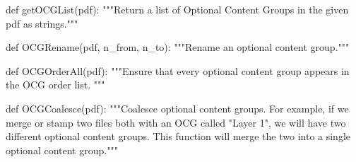 def getOCGList(pdf):
    """Return a list of Optional Content Groups in the given pdf as strings."""

def OCGRename(pdf, n_from, n_to):
    """Rename an optional content group."""

def OCGOrderAll(pdf):
    """Ensure that every optional content group appears in the OCG order list.
    """

def OCGCoalesce(pdf):
    """Coalesce optional content groups. For example, if we merge or stamp two
    files both with an OCG called "Layer 1", we will have two different
    optional content groups. This function will merge the two into a single
    optional content group."""
